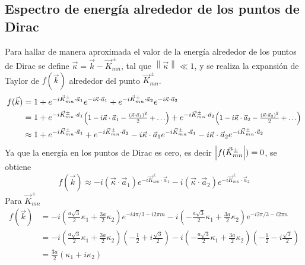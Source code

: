 \subsection{Espectro de energía alrededor de los puntos de Dirac}
Para hallar de manera aproximada el valor de la energía alrededor de los puntos de Dirac se define $\vec{\kappa} = \vec{k}-\vec{K}^{\pm}_{mn}$, tal que $\left\lVert \vec{\kappa}\right\rVert\ll 1$, y se realiza la expansión de Taylor de $f(\vec{k})$ alrededor del punto $\vec{K}^{\pm}_{mn}$.
\begin{align}
	\nonumber	f(\vec{k}) & = 1+e^{-i\vec{K}^{\pm}_{mn}\cdot \vec{a}_1}e^{-i \vec{\kappa}\cdot \vec{a}_1}+e^{-i \vec{K}^{\pm}_{mn}\cdot \vec{a}_2}e^{-i \vec{\kappa}\cdot \vec{a}_2}                                                                                                                                                                                                               \\
	\nonumber            & =1+e^{-i\vec{K}^{\pm}_{mn}\cdot \vec{a}_1}\resizebox{0.3\textwidth}{!}{$\left(1-i \vec{\kappa}\cdot \vec{a}_1 - \frac{\left(\vec{\kappa}\cdot \vec{a}_1\right)^2}{2}+\ldots\right)$}+e^{-i\vec{K}^{\pm}_{mn}\cdot \vec{a}_2}\resizebox{0.3\textwidth}{!}{$\left(1-i \vec{\kappa}\cdot \vec{a}_2 - \frac{\left(\vec{\kappa}\cdot \vec{a}_2\right)^2}{2}+\ldots\right)$} \\
	                     & \approx 1+e^{-i \vec{K}^{\pm}_{mn}\cdot \vec{a}_1}+e^{-i \vec{K}^{\pm}_{mn}\cdot \vec{a}_2}-i \vec{\kappa}\cdot \vec{a}_1e^{-i \vec{K}^{\pm}_{mn}\cdot \vec{a}_1}-i \vec{\kappa}\cdot \vec{a}_2 e^{-i \vec{K}^{\pm}_{mn}\cdot \vec{a}_2}
\end{align}
Ya que la energía en los puntos de Dirac es cero, es decir $\abs{f(\vec{K}^{\pm}_{mn}})=0$, se obtiene
\begin{equation}
	f(\vec{k}) \approx -i (\vec{\kappa}\cdot \vec{a}_1) e^{-i \vec{K}^{\pm}_{mn}\cdot \vec{a}_1} -i( \vec{\kappa}\cdot \vec{a}_2) e^{-i \vec{K}^{\pm}_{mn} \cdot \vec{a}_2}
\end{equation}
Para $\vec{K}^{+}_{mn}$
\begin{align}
	\nonumber f(\vec{k}) & = -i \left(\frac{a\sqrt{3}}{2}\kappa_1+\frac{3a}{2}\kappa_2\right)e^{-i 4\pi/3-i2\pi m}-i \left(-\frac{a\sqrt{3}}{2}\kappa_1 + \frac{3a}{2}\kappa_2\right)e^{-i 2\pi/3-i2\pi n}                                                     \\
	\nonumber            & = -i \left(\frac{a\sqrt{3}}{2}\kappa_1+\frac{3a}{2}\kappa_2\right)\left(-\frac{1}{2}+i \frac{\sqrt{3}}{2} \right)-i \left(-\frac{a\sqrt{3}}{2}\kappa_1 + \frac{3a}{2}\kappa_2\right)\left(-\frac{1}{2}-i \frac{\sqrt{3}}{2} \right) \\
                       & = \frac{3a}{2}\left(\kappa_1+i\kappa_2\right)\label{eq:firstApproxEnergy1}
\end{align}

